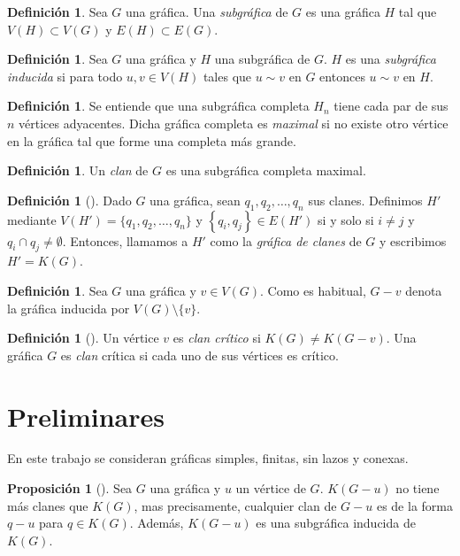 \documentclass[12pt]{book}
\theoremstyle{definition}
\newtheorem{proposition}[theorem]{Proposición}
\newtheorem{definition}[theorem]{Definición}
\begin{document}
\begin{definition}
Sea $G$ una gráfica. Una \emph{subgráfica} de $G$ es una gráfica $H$ tal que $V(H)\subset V(G)$ y $E(H)\subset E(G)$.
\end{definition}

\begin{definition}
Sea $G$ una gráfica y $H$ una subgráfica de $G$. $H$ es una \emph{subgráfica inducida} si para todo $u,v\in V(H)$ tales que $u\sim v$ en $G$ entonces $u\sim v$ en $H$.
\end{definition}

\begin{definition}
Se entiende que una subgráfica completa $H_n$ tiene cada par de sus $n$ vértices adyacentes. Dicha gráfica completa es \emph{maximal} si no existe otro vértice en la gráfica tal que forme una completa más grande.
\end{definition}

\begin{definition}
Un \emph{clan} de $G$ es una subgráfica completa maximal. 
\end{definition}

\begin{definition}[\citealt{Hamelink:1968}]
Dado $G$ una gráfica, sean $q_1, q_2, \dots, q_n $ sus clanes. Definimos $H'$ mediante $ V(H') = \{q_1, q_2, \dots, q_n\}$ y $\left\{q_i, q_j\right\}\in E(H')$ si y solo si $i \neq j$ y $q_i \cap q_j \neq \emptyset$.  
Entonces, llamamos a $H'$ como la \emph{gráfica de clanes} de $G$ y escribimos $H'=K(G)$.
\end{definition}

\begin{definition}
Sea $G$ una gráfica y $v \in V(G)$. Como es habitual, $G-v$ denota la gráfica inducida por $V(G)\setminus \{v\}$.  
\end{definition}

\begin{definition}[\citealt{Escalante:1974}]
Un vértice $v$ es \emph{clan crítico} si $K(G)\neq K(G-v)$. Una gráfica $G$ es \emph{clan} crítica si cada uno de sus vértices es crítico.
\end{definition}

\section{Preliminares}
En este trabajo se consideran gráficas simples, finitas, sin lazos y conexas.

\begin{proposition}[\citealt{Escalante:1974}]\label{P1.14}
Sea $G$ una gráfica y $u$ un vértice de $G$. $K(G-u)$ no tiene más clanes que $K(G)$, mas precisamente, cualquier clan de $G-u$ es de la forma $q-u$ para $q\in K(G)$. Además, $K(G-u)$ es una subgráfica inducida de $K(G)$.
\end{proposition}
\end{document}
